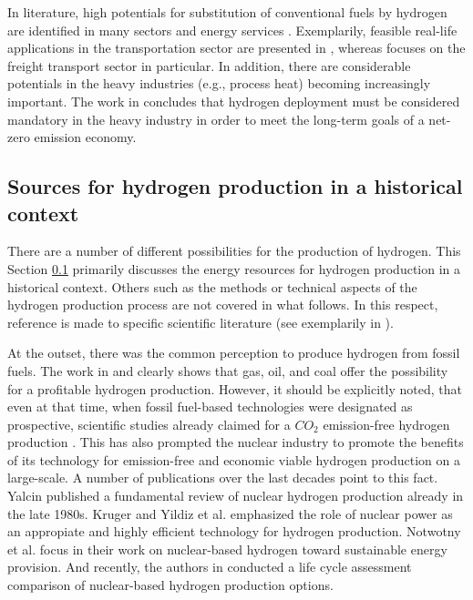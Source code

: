 \documentclass[review]{elsarticle}
\begin{document}
In literature, high potentials for substitution of conventional fuels by hydrogen are identified in many sectors \cite{burandt2019decarbonizing} and energy services \cite{mouli2021mapping}. Exemplarily, feasible real-life applications in the transportation sector are presented in \cite{zhang2016times}, whereas \cite{auer2020development} focuses on the freight transport sector in particular. In addition, there are considerable potentials in the heavy industries (e.g., process heat) becoming increasingly important. The work in \cite{rissman2020technologies} concludes that hydrogen deployment must be considered mandatory in the heavy industry in order to meet the long-term goals of a net-zero emission economy. 


\subsection{Sources for hydrogen production in a historical context}\label{state2}
There are a number of different possibilities for the production of hydrogen. This Section \ref{state2} primarily discusses the energy resources for hydrogen production in a historical context. Others such as the methods or technical aspects of the hydrogen production process are not covered in what follows. In this respect, reference is made to specific scientific literature (see exemplarily in \cite{dincer2015review}).\vspace{0.3cm}

At the outset, there was the common perception to produce hydrogen from fossil fuels. The work in \cite{steinberg1989modern} and \cite{kathe2016hydrogen} clearly shows that gas, oil, and coal offer the possibility for a profitable hydrogen production. However, it should be explicitly noted, that even at that time, when fossil fuel-based technologies were designated as prospective, scientific studies already claimed for a $CO_2$ emission-free hydrogen production \cite{muradov1993produce}. This has also prompted the nuclear industry to promote the benefits of its technology for emission-free and economic viable hydrogen production on a large-scale. A number of publications over the last decades point to this fact. Yalcin \cite{yalcin1989review} published a fundamental review of nuclear hydrogen production already in the late 1980s. Kruger \cite{kruger2009nuclear} and Yildiz et al. \cite{yildiz2006efficiency} emphasized the role of nuclear power as an appropiate and highly efficient technology for hydrogen production. Notwotny et al. \cite{nowotny2016towards} focus in their work on nuclear-based hydrogen toward sustainable energy provision. And recently, the authors in \cite{karaca2020life} conducted a life cycle assessment comparison of nuclear-based hydrogen production options.\vspace{0.3cm}
\end{document}
